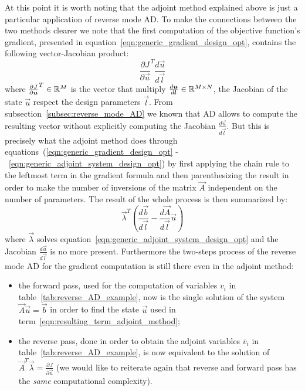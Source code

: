 \bigskip
At this point it is worth noting that the adjoint method explained above is just a particular application of reverse mode AD. To make the connections between the two methods clearer we note that the first computation of the  objective function's gradient, presented in equation~\eqref{eqn:generic_gradient_design_opt}, contains the following vector-Jacobian product:
\begin{equation}
	\label{eqn:vJp_design_opt}
	\frac{\partial J}{\partial \vec{u}}^T \frac{d\vec{u}}{d\vec{l}}
\end{equation}
where $\frac{\partial J}{\partial \boldsymbol{u}}^T \in \mathbb{R}^M$ is the vector that multiply $\frac{d\boldsymbol{u}}{d\boldsymbol{l}} \in \mathbb{R}^{M \times N}$, the Jacobian of the state $\vec{u}$ respect the design parameters $\vec{l}$.
From subsection~\vref{subsec:reverse_mode_AD} we known that AD allows to compute the resulting vector without explicitly computing the Jacobian $\frac{d\vec{u}}{d\vec{l}}$. But this is precisely what the adjoint method does through equations~(\ref{eqn:generic_gradient_design_opt} -~\ref{eqn:generic_adjoint_system_design_opt}) by first applying the chain rule to the leftmost term in the gradient formula and then parenthesizing the result in order to make the number of inversions of the matrix $\vec{A}$ independent on the number of parameters.
The result of the whole process is then summarized by:
\begin{equation}
	\label{eqn:resulting_term_adjoint_method}
	\vec{\lambda}^T \left( \frac{d\vec{b}}{d\vec{l}} - \frac{d\vec{A}}{d\vec{l}}\vec{u} \right)
\end{equation}
where $\vec{\lambda}$ solves equation~\eqref{eqn:generic_adjoint_system_design_opt} and the Jacobian $\frac{d\vec{u}}{d\vec{l}}$ is no more present. Furthermore the two-steps process of the reverse mode AD for the gradient computation is still there even in the adjoint method:
\begin{itemize}
	\item the forward pass, used for the computation of variables $v_i$ in table~\ref{tab:reverse_AD_example}, now is the single solution of the system $\vec{A}\vec{u}=\vec{b}$ in order to find the state $\vec{u}$ used in term~\eqref{eqn:resulting_term_adjoint_method};
	\item the reverse pass, done in order to obtain the adjoint variables $\overline{v}_i$ in table~\ref{tab:reverse_AD_example}, is now equivalent to the solution of $\vec{A}^T \vec{\lambda} = \frac{\partial J}{\partial \vec{u}}$ (we would like to reiterate again that reverse and forward pass has the \emph{same} computational complexity). 
\end{itemize}

